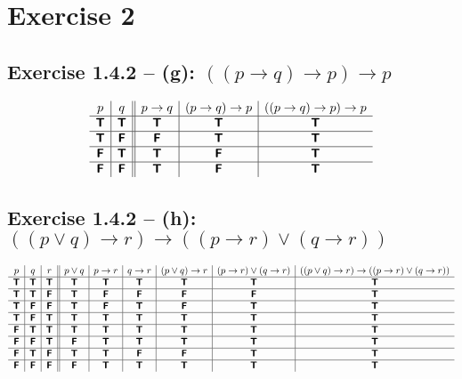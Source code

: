 \documentclass[11pt]{article}
\newcommand{\TTT}{\bm{\mathsf{T}}}
\newcommand{\FFF}{\bm{\mathsf{F}}}
\begin{document}
\section*{Exercise 2}

\subsection*{Exercise 1.4.2 -- (g): $((p \to q) \to p) \to p$}
\[
\begin{array}{ c | c || c | c | c}
 p & q & p \to q & (p \to q) \to p &  ((p \to q) \to p) \to p
\\ \hline 
 \TTT & \TTT & \TTT & \TTT & \TTT\\ \hline  
 \TTT & \FFF & \FFF & \TTT & \TTT\\ \hline  
 \FFF & \TTT & \TTT & \FFF & \TTT\\ \hline  
 \FFF & \FFF & \TTT & \FFF & \TTT  
\end{array}
\]

\subsection*{Exercise 1.4.2 -- (h): $((p \lor q) \to r) \to ((p \to r) \lor (q \to r))$}
\[
\begin{array}{ c | c | c || c | c | c | c | c | c}
    p & q & r & p \lor q & p \to r & q \to r & (p \lor q) \to r & (p \to r) \lor (q \to r) & ((p \lor q) \to r) \to ((p \to r) \lor (q \to r))\\ \hline 
    \TTT & \TTT & \TTT & \TTT & \TTT & \TTT & \TTT & \TTT & \TTT\\ \hline  
    \TTT & \TTT & \FFF & \TTT & \FFF & \FFF & \FFF & \FFF & \TTT\\ \hline  
    \TTT & \FFF & \FFF & \TTT & \FFF & \TTT & \FFF & \TTT & \TTT\\ \hline  
    \TTT & \FFF & \TTT & \TTT & \TTT & \TTT & \TTT & \TTT & \TTT\\ \hline  
    \FFF & \TTT & \TTT & \TTT & \TTT & \TTT & \TTT & \TTT & \TTT\\ \hline  
    \FFF & \FFF & \TTT & \FFF & \TTT & \TTT & \TTT & \TTT & \TTT\\ \hline  
    \FFF & \TTT & \FFF & \TTT & \TTT & \FFF & \FFF & \TTT & \TTT\\ \hline
    \FFF & \FFF & \FFF & \FFF & \TTT & \TTT & \TTT & \TTT & \TTT
   \end{array}
\]
\end{document}

